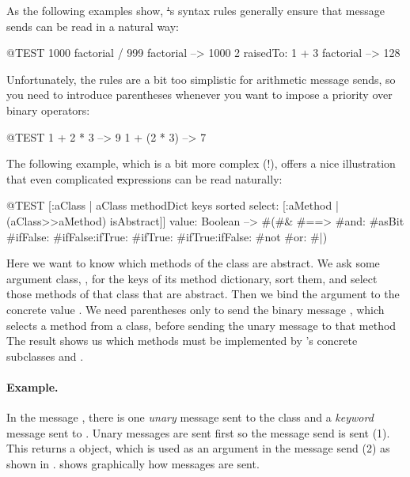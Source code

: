 \documentclass[a4paper,10pt,twoside]{book}
\begin{document}
As the following examples show, \st's syntax rules generally ensure that message sends can be read in a natural way:
\begin{code}{@TEST}
1000 factorial / 999 factorial --> 1000
2 raisedTo: 1 + 3 factorial     --> 128
\end{code}
\noindent

Unfortunately, the rules are a bit too simplistic for arithmetic message sends, so you need to introduce parentheses whenever you want to impose a priority over binary operators:
\begin{code}{@TEST}
1 + 2 * 3   --> 9
1 + (2 * 3) --> 7
\end{code}

The following example, which is a bit more complex (!), offers a nice illustration that even complicated \st expressions can be read naturally:
\begin{code}{@TEST}
[:aClass | aClass methodDict keys sorted select: [:aMethod | (aClass>>aMethod) isAbstract]] value: Boolean --> #(#& #==> #and: #asBit #ifFalse: #ifFalse:ifTrue: #ifTrue: #ifTrue:ifFalse: #not #or: #|)
\end{code}
\noindent
Here we want to know which methods of the  class are abstract.
We ask some argument class, , for the keys of its method dictionary, sort them, and select those methods of that class that are abstract.
Then we bind the argument  to the concrete value .
We need parentheses only to send the binary message \ct{>>}, which selects a method from a class, before sending the unary message \mbox{} to that method
The result shows us which methods must be implemented by 's concrete subclasses  and .



\paragraph{Example.}
In the message , there is one \emph{unary} message  sent to the class  and a \emph{keyword} message  sent to .
Unary messages are sent first so the message send  is sent (1).
This returns a  object, which is used as an argument in the message send  (2) as shown in .
 shows graphically how messages are sent.
\end{document}
